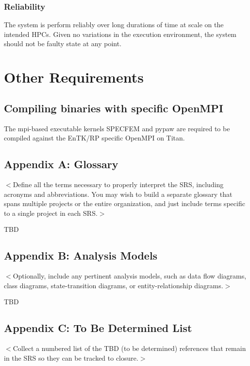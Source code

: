 \documentclass{scrreprt}
\begin{document}
\subsection{Reliability}

The system is perform reliably over long durations of time at scale on the intended HPCs. Given no variations in the execution environment, the system should not be faulty state at any point.

\chapter{Other Requirements}

\section{Compiling binaries with specific OpenMPI}

The mpi-based executable kernels SPECFEM and pypaw are required to be compiled against the EnTK/RP specific OpenMPI on Titan.

\section{Appendix A: Glossary}
$<$Define all the terms necessary to properly interpret the SRS, including 
acronyms and abbreviations. You may wish to build a separate glossary that spans 
multiple projects or the entire organization, and just include terms specific to 
a single project in each SRS.$>$

TBD

\section{Appendix B: Analysis Models}
$<$Optionally, include any pertinent analysis models, such as data flow 
diagrams, class diagrams, state-transition diagrams, or entity-relationship 
diagrams.$>$

TBD

\section{Appendix C: To Be Determined List}
$<$Collect a numbered list of the TBD (to be determined) references that remain 
in the SRS so they can be tracked to closure.$>$
\end{document}
